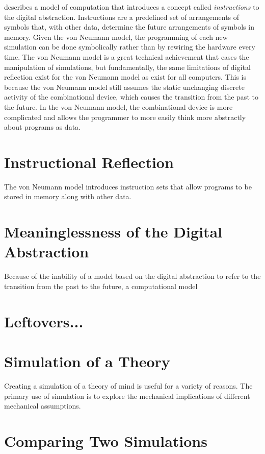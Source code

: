 \cite{von_neumann:1945} describes a model of computation that
introduces a concept called \emph{instructions} to the digital
abstraction.  Instructions are a predefined set of arrangements of
symbols that, with other data, determine the future arrangements of
symbols in memory.  Given the von Neumann model, the programming of
each new simulation can be done symbolically rather than by rewiring
the hardware every time.  The von Neumann model is a great technical
achievement that eases the manipulation of simulations, but
fundamentally, the same limitations of digital reflection exist for
the von Neumann model as exist for all computers.  This is because the
von Neumann model still assumes the static unchanging discrete
activity of the combinational device, which causes the transition from
the past to the future.  In the von Neumann model, the combinational
device is more complicated and allows the programmer to more easily
think more abstractly about programs as data.

\section{Instructional Reflection}

The von Neumann model introduces instruction sets that allow programs
to be stored in memory along with other data.

\section{Meaninglessness of the Digital Abstraction}



Because of the inability of a model based on the digital abstraction
to refer to the transition from the past to the future, a
computational model

\section{Leftovers...}

\section{Simulation of a Theory}

Creating a simulation of a theory of mind is useful for a variety of
reasons.  The primary use of simulation is to explore the mechanical
implications of different mechanical assumptions.

\section{Comparing Two Simulations}

